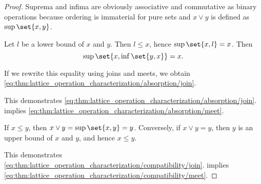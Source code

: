 \begin{proof}
   Suprema and infima are obviously associative and commutative as binary operations because ordering is immaterial for pure sets and \( x \vee y \) is defined as \( \sup\set{ x, y } \).

   Let \( l \) be a lower bound of \( x \) and \( y \). Then \( l \leq x \), hence \( \sup\set{ x, l } = x \). Then
  \begin{equation*}
    \sup\set{ x, \inf\set{ y, x } } = x.
  \end{equation*}

  If we rewrite this equality using joins and meets, we obtain \eqref{eq:thm:lattice_operation_characterization/absorption/join}.

  This demonstrates \eqref{eq:thm:lattice_operation_characterization/absorption/join}.  implies \eqref{eq:thm:lattice_operation_characterization/absorption/meet}.

   If \( x \leq y \), then \( x \vee y = \sup\set{ x, y } = y \). Conversely, if \( x \vee y = y \), then \( y \) is an upper bound of \( x \) and \( y \), and hence \( x \leq y \).

  This demonstrates \eqref{eq:thm:lattice_operation_characterization/compatibility/join}.  implies \eqref{eq:thm:lattice_operation_characterization/compatibility/meet}.
\end{proof}

